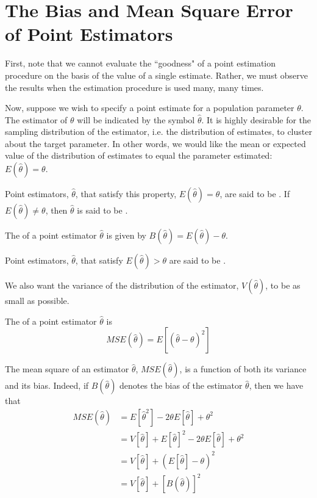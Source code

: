 \documentclass[12pt, a4paper, twoside, openright, titlepage]{book}
\begin{document}
\section{\textsection The Bias and Mean Square Error of Point Estimators}

First, note that we cannot evaluate the ``goodness" of a point estimation procedure on the basis of the value of a single estimate. Rather, we must observe the results when the estimation procedure is used many, many times. 


Now, suppose we wish to specify a point estimate for a population parameter $\theta$. The estimator of $\theta$ will be indicated by the symbol $\hat{\theta}$. It is highly desirable for the sampling distribution of the estimator, i.e. the distribution of estimates, to cluster about the target parameter. In other words, we would like the mean or expected value of the distribution of estimates to equal the parameter estimated: $E(\hat{\theta}) = \theta$. 

\begin{defn}{}{}
    Point estimators, $\hat{\theta}$, that satisfy this property, $E(\hat{\theta}) = \theta$, are said to be . If $E(\hat{\theta}) \neq \theta$, then $\hat{\theta}$ is said to be .
\end{defn}

\begin{defn}{}{}
    The  of a point estimator $\hat{\theta}$ is given by $B(\hat{\theta}) = E(\hat{\theta}) - \theta$.
\end{defn}


\begin{defn}{}{}
    Point estimators, $\hat{\theta}$, that satisfy $E(\hat{\theta}) > \theta$ are said to be .
\end{defn}


We also want the variance of the distribution of the estimator, $V(\hat{\theta})$, to be as small as possible.

\begin{defn}{}{}
    The  of a point estimator $\hat{\theta}$ is \begin{equation*}
        MSE(\hat{\theta}) = E[(\hat{\theta}-\theta)^2]
    \end{equation*}
\end{defn}

The mean square of an estimator $\hat{\theta}$, $MSE(\hat{\theta})$, is a function of both its variance and its bias. Indeed, if $B(\hat{\theta})$ denotes the bias of the estimator $\hat{\theta}$, then we have that \begin{align*}
    MSE(\hat{\theta}) &= E[\hat{\theta}^2] - 2\theta E[\hat{\theta}] + \theta^2 \\
    &= V[\hat{\theta}] + E[\hat{\theta}]^2-2\theta E[\hat{\theta}] + \theta^2 \\
    &= V[\hat{\theta}] + (E[\hat{\theta}]-\theta)^2 \\
    &= V[\hat{\theta}] + [B(\hat{\theta})]^2
\end{align*}
\end{document}

